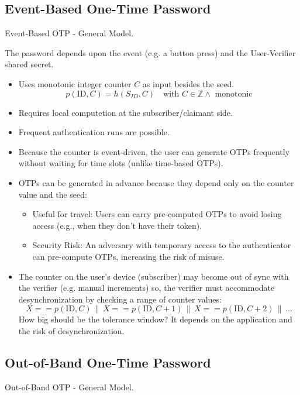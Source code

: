 \subsection{Event-Based One-Time Password}
\begin{center}
    Event-Based OTP - General Model.
\end{center}
The password depends upon the event (e.g. a button press) and the User-Verifier shared secret.
\begin{itemize}
    \item Uses monotonic integer counter $C$ as input besides the seed.
    \[
        p(\text{ID}, C)=h(S_{ID}, C) \quad \text{with } C \in \mathbb{Z} \land\text { monotonic}
    \]
    \item Requires local computetion at the subscriber/claimant side.
    \item Frequent authentication runs are possible.
    \item Because the counter is event-driven, the user can generate OTPs frequently without waiting for time slots (unlike time-based OTPs).
    \item OTPs can be generated in advance because they depend only on the counter value and the seed:
    \begin{itemize}
        \item Useful for travel: Users can carry pre-computed OTPs to avoid losing access (e.g., when they don’t have their token).
        \item Security Risk: An adversary with temporary access to the authenticator can pre-compute OTPs, increasing the risk of misuse.
    \end{itemize}
    \item The counter on the user’s device (subscriber) may become out of sync with the verifier (e.g. manual increments) so, the verifier must accommodate desynchronization by checking a range of counter values:
    \[
X == p(\text{ID}, C) \, \| \, X == p(\text{ID}, C+1) \, \| \, X == p(\text{ID},C+2) \, \| \, \dots
    \]
    How big should be the tolerance window? It depends on the application and the risk of desynchronization.
\end{itemize}

\subsection{Out-of-Band One-Time Password}
\begin{center}
    Out-of-Band OTP - General Model.
\end{center}

